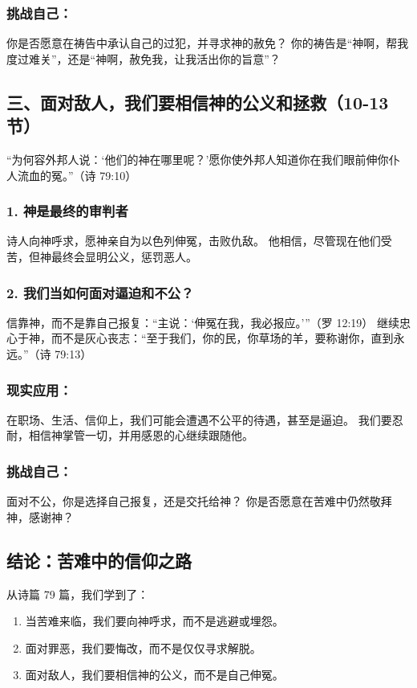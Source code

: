 \documentclass[a4paper, 12pt]{article}
\begin{document}
\subsubsection*{挑战自己：}

你是否愿意在祷告中承认自己的过犯，并寻求神的赦免？
你的祷告是“神啊，帮我度过难关”，还是“神啊，赦免我，让我活出你的旨意”？
\subsection*{三、面对敌人，我们要相信神的公义和拯救（10-13节）}
“为何容外邦人说：‘他们的神在哪里呢？’愿你使外邦人知道你在我们眼前伸你仆人流血的冤。”（诗 79:10）

\subsubsection*{1. 神是最终的审判者}
诗人向神呼求，愿神亲自为以色列伸冤，击败仇敌。
他相信，尽管现在他们受苦，但神最终会显明公义，惩罚恶人。
\subsubsection*{2. 我们当如何面对逼迫和不公？}
信靠神，而不是靠自己报复：“主说：‘伸冤在我，我必报应。’”（罗 12:19）
继续忠心于神，而不是灰心丧志：“至于我们，你的民，你草场的羊，要称谢你，直到永远。”（诗 79:13）
\subsubsection*{现实应用：}

在职场、生活、信仰上，我们可能会遭遇不公平的待遇，甚至是逼迫。
我们要忍耐，相信神掌管一切，并用感恩的心继续跟随他。
\subsubsection*{挑战自己：}

面对不公，你是选择自己报复，还是交托给神？
你是否愿意在苦难中仍然敬拜神，感谢神？
\subsection*{结论：苦难中的信仰之路}
从诗篇 79 篇，我们学到了：
\begin{enumerate}
    \item 当苦难来临，我们要向神呼求，而不是逃避或埋怨。

    \item 面对罪恶，我们要悔改，而不是仅仅寻求解脱。

    \item 面对敌人，我们要相信神的公义，而不是自己伸冤。

\end{enumerate}
\end{document}
